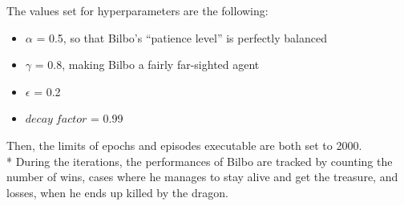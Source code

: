 The values set for hyperparameters are the following:
\begin{itemize}[noitemsep, topsep=0ex]
  \item $\alpha$ = 0.5, so that Bilbo's ``patience level'' is perfectly balanced
  \item $\gamma$ = 0.8, making Bilbo a fairly far-sighted agent 
  \item $\epsilon$ = 0.2
  \item $decay\;factor$ = 0.99
\end{itemize} 
Then, the limits of epochs and episodes executable are both set to 2000.\\*
During the iterations, the performances of Bilbo are tracked by counting the number of wins, cases where he manages to stay alive and get the treasure, and losses, when he ends up killed by the dragon.

